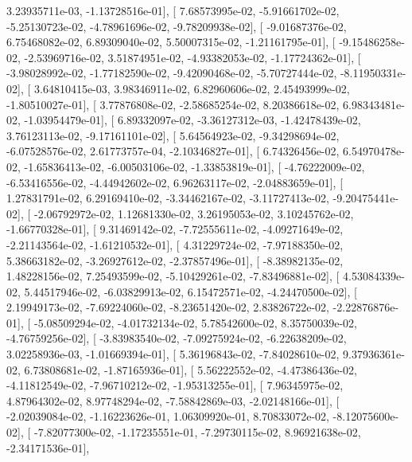 \documentclass{article}
\begin{document}
          3.23935711e-03,  -1.13728516e-01],
       [  7.68573995e-02,  -5.91661702e-02,  -5.25130723e-02,
         -4.78961696e-02,  -9.78209938e-02],
       [ -9.01687376e-02,   6.75468082e-02,   6.89309040e-02,
          5.50007315e-02,  -1.21161795e-01],
       [ -9.15486258e-02,  -2.53969716e-02,   3.51874951e-02,
         -4.93382053e-02,  -1.17724362e-01],
       [ -3.98028992e-02,  -1.77182590e-02,  -9.42090468e-02,
         -5.70727444e-02,  -8.11950331e-02],
       [  3.64810415e-03,   3.98346911e-02,   6.82960606e-02,
          2.45493999e-02,  -1.80510027e-01],
       [  3.77876808e-02,  -2.58685254e-02,   8.20386618e-02,
          6.98343481e-02,  -1.03954479e-01],
       [  6.89332097e-02,  -3.36127312e-03,  -1.42478439e-02,
          3.76123113e-02,  -9.17161101e-02],
       [  5.64564923e-02,  -9.34298694e-02,  -6.07528576e-02,
          2.61773757e-04,  -2.10346827e-01],
       [  6.74326456e-02,   6.54970478e-02,  -1.65836413e-02,
         -6.00503106e-02,  -1.33853819e-01],
       [ -4.76222009e-02,  -6.53416556e-02,  -4.44942602e-02,
          6.96263117e-02,  -2.04883659e-01],
       [  1.27831791e-02,   6.29169410e-02,  -3.34462167e-02,
         -3.11727413e-02,  -9.20475441e-02],
       [ -2.06792972e-02,   1.12681330e-02,   3.26195053e-02,
          3.10245762e-02,  -1.66770328e-01],
       [  9.31469142e-02,  -7.72555611e-02,  -4.09271649e-02,
         -2.21143564e-02,  -1.61210532e-01],
       [  4.31229724e-02,  -7.97188350e-02,   5.38663182e-02,
         -3.26927612e-02,  -2.37857496e-01],
       [ -8.38982135e-02,   1.48228156e-02,   7.25493599e-02,
         -5.10429261e-02,  -7.83496881e-02],
       [  4.53084339e-02,   5.44517946e-02,  -6.03829913e-02,
          6.15472571e-02,  -4.24470500e-02],
       [  2.19949173e-02,  -7.69224060e-02,  -8.23651420e-02,
          2.83826722e-02,  -2.22876876e-01],
       [ -5.08509294e-02,  -4.01732134e-02,   5.78542600e-02,
          8.35750039e-02,  -4.76759256e-02],
       [ -3.83983540e-02,  -7.09275924e-02,  -6.22638209e-02,
          3.02258936e-03,  -1.01669394e-01],
       [  5.36196843e-02,  -7.84028610e-02,   9.37936361e-02,
          6.73808681e-02,  -1.87165936e-01],
       [  5.56222552e-02,  -4.47386436e-02,  -4.11812549e-02,
         -7.96710212e-02,  -1.95313255e-01],
       [  7.96345975e-02,   4.87964302e-02,   8.97748294e-02,
         -7.58842869e-03,  -2.02148166e-01],
       [ -2.02039084e-02,  -1.16223626e-01,   1.06309920e-01,
          8.70833072e-02,  -8.12075600e-02],
       [ -7.82077300e-02,  -1.17235551e-01,  -7.29730115e-02,
          8.96921638e-02,  -2.34171536e-01],
\end{document}
